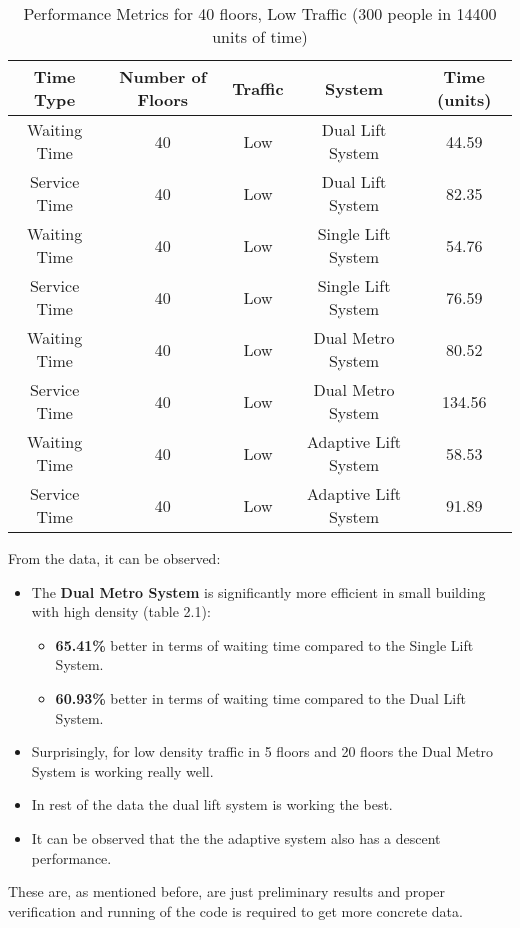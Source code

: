 \documentclass[12pt,a4paper]{report}
\begin{document}
\begin{table}[H]
\centering
\begin{tabular}{|c|c|c|c|c|}
\hline
\textbf{Time Type}    & \textbf{Number of Floors} & \textbf{Traffic} & \textbf{System}     & \textbf{Time (units)} \\ \hline
Waiting Time         & 40                    & Low              & Dual Lift System               & 44.59          \\ \hline
Service Time         & 40                    & Low              & Dual Lift System               & 82.35            \\ \hline
Waiting Time         & 40                    & Low              & Single Lift System            & 54.76            \\ \hline
Service Time         & 40                    & Low              & Single Lift System            & 76.59             \\ \hline
Waiting Time         & 40                    & Low              & Dual Metro System  & 80.52            \\ \hline
Service Time         & 40                    & Low              & Dual Metro System  & 134.56              \\ \hline
Waiting Time         & 40                     & Low       & Adaptive Lift System           & 58.53             \\ \hline
Service Time         & 40                     & Low         & Adaptive Lift System         & 91.89             \\ \hline
\end{tabular}
\caption{Performance Metrics for 40 floors, Low Traffic (300 people in 14400 units of time)}
\end{table}


From the data, it can be observed:
\begin{itemize}
    \item The \textbf{Dual Metro System} is significantly more efficient in small building with high density (table 2.1):
    \begin{itemize}
        \item \textbf{65.41\%} better in terms of waiting time compared to the Single Lift System.
        \item \textbf{60.93\%} better in terms of waiting time compared to the Dual Lift System.
    \end{itemize}
    \item Surprisingly, for low density traffic in 5 floors and 20 floors the Dual Metro System is working really well.
    \item In rest of the data the dual lift system is working the best.
    \item It can be observed that the the adaptive system also has a descent performance.
\end{itemize}
These are, as mentioned before, are just preliminary results and proper verification and running of the code is required to get more concrete data.
\end{document}
